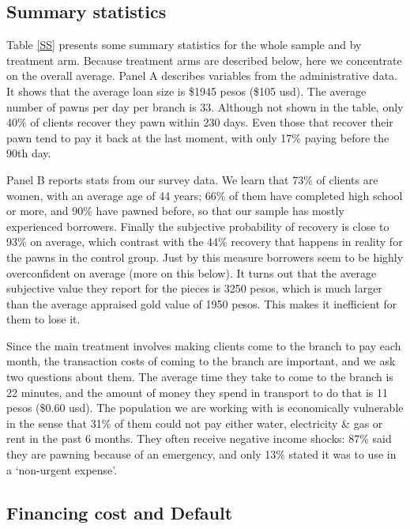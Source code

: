 \documentclass[11pt]{article}
\begin{document}
\subsection{Summary statistics}

Table \ref{SS} presents some summary statistics for the whole sample and by treatment arm. Because treatment arms are described below, here we concentrate on the overall average. Panel A describes variables from the administrative data. It shows that the average loan size is \$1945 pesos (\$105 usd). The average number of pawns per day per branch is 33. Although not shown in the table, only 40\% of clients recover they pawn within 230 days. Even those that recover their pawn tend to pay it back at the last moment, with only 17\% paying before the 90th day.

Panel B reports stats from our survey data. We learn that 73\% of clients are women, with an average age of 44 years; 66\% of them have completed high school or more, and 90\% have pawned before, so that our sample has mostly experienced borrowers. Finally the subjective probability of recovery is close to 93\% on average, which contrast with the 44\% recovery that happens in reality for the pawns in the control group. Just by this measure borrowers seem to be highly overconfident on average (more on this below). It turns out that the average subjective value they report for the pieces is 3250 pesos, which is much larger than the average appraised gold value of 1950 pesos. This makes it inefficient for them to lose it.

Since the main treatment involves making clients come to the branch to pay each month, the transaction costs of coming to the branch are important, and we ask two questions about them. The average time they take to come to the branch is 22 minutes, and the amount of money they spend in transport to do that is 11 pesos (\$0.60 usd).  
The population we are working with is economically vulnerable in the sense that 31\% of them could not pay either water, electricity \& gas or rent in the past 6 months. They often receive negative income shocks: 87\% said they are pawning because of an emergency, and only 13\% stated it was to use in a `non-urgent expense'.




\subsection{Financing cost and Default} \label{FC_def}
\end{document}
